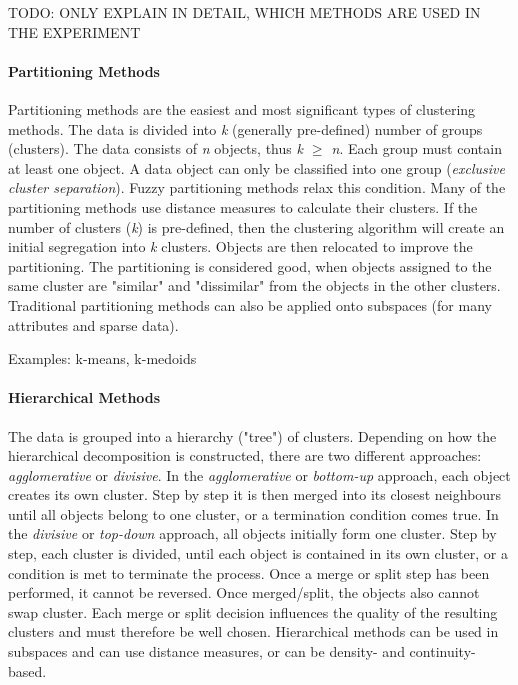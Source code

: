 TODO: ONLY EXPLAIN IN DETAIL, WHICH METHODS ARE USED IN THE EXPERIMENT
  \paragraph{Partitioning Methods}
  Partitioning methods are the easiest and most significant types of clustering methods. The data is divided into \textit{k} (generally pre-defined) number of groups (clusters). The data consists of \textit{n} objects, thus \textit{k $\geq$ n}. Each group must contain at least one object. A data object can only be classified into one group (\textit{exclusive cluster separation}). Fuzzy partitioning methods relax this condition.
  Many of the partitioning methods use distance measures to calculate their clusters. If the number of clusters (\textit{k}) is pre-defined, then the clustering algorithm will create an initial segregation into \textit{k} clusters. Objects are then relocated to improve the partitioning. The partitioning is considered good, when objects assigned to the same cluster are "similar" and "dissimilar" from the objects in the other clusters. Traditional partitioning methods can also be applied onto subspaces (for many attributes and sparse data). 
  
  Examples: k-means, k-medoids



  \paragraph{Hierarchical Methods}
  The data is grouped into a hierarchy ("tree") of clusters. Depending on how the hierarchical decomposition is constructed, there are two different approaches: \textit{agglomerative} or \textit{divisive}. In the \textit{agglomerative} or \textit{bottom-up} approach, each object creates its own cluster. Step by step it is then merged into its closest neighbours until all objects belong to one cluster, or a termination condition comes true. In the \textit{divisive} or \textit{top-down} approach, all objects initially form one cluster. Step by step, each cluster is divided, until each object is contained in its own cluster, or a condition is met to terminate the process. Once a merge or split step has been performed, it cannot be reversed. Once merged/split, the objects also cannot swap cluster. Each merge or split decision influences the quality of the resulting clusters and must therefore be well chosen. Hierarchical methods can be used in subspaces and can use distance measures, or can be density- and continuity-based.

